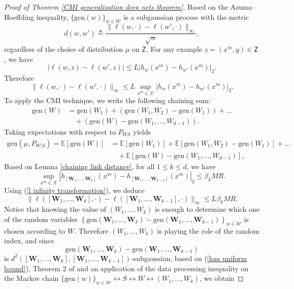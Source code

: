 \documentclass{article}
\newcommand{\E}{\mathbb{E}}
\newcommand{\gen}{\mathrm{gen}}
\newcommand{\W}[0]{\mathcal{W}}
\begin{document}
\begin{proof}[Proof of Theorem \ref{CMI generalization deep nets theorem}]

	Based on the Azuma--Hoeffding inequality, $\{\gen(w)\}_{w\in \mathcal{W}}$ is a subgaussian process with the metric
	\begin{equation}
	d(w, w')\triangleq \frac{\|\ell({w},\cdot)-\ell({w'},\cdot)\|_{\infty}}{\sqrt{n}},\nonumber
	\end{equation}
	regardless of the choice of distribution $\mu$ on $\mathsf{Z}$. For any example $z=(x^m,y)\in \mathsf{Z}$, we have 
\begin{equation}
	|\ell(w,z)-\ell(w',z)|\leq L\left|h_{w}(x^m)-h_{w'}(x^m)\right|_2.\nonumber
\end{equation}
	Therefore 
	\begin{equation}
		\|\ell(w,\cdot)-\ell(w',\cdot)\|_{\infty}\leq L \sup_{x^m\in\mathcal{X}} |h_{w}(x^m)-h_{w'}(x^m)|_{2}.\label{l infinity transformation}
	\end{equation}
	To apply the CMI technique, 
	we write the following chaining sum:
	\begin{align}
		\gen(W)&=\gen(W_1)+(\gen(W_1,W_2)-\gen(W_1))+\dots \nonumber\\
		&\quad +(\gen(W)-\gen(W_1,\dots,W_{d-1})).\nonumber
	\end{align}
	Taking expectations with respect to $P_{WS}$ yields 
	\begin{align}
		\gen(\mu, P_{W|S})= \E[\gen(W)]&=\E[\gen(W_1)]+\E[\gen(W_1,W_2)-\gen(W_1)]+\dots \nonumber\\
		&\quad +\E[\gen(W)-\gen(W_1,\dots,W_{d-1})],\label{expected value chaining sum appendix}
	\end{align}
	Based on Lemma \ref{chaining link distance},  for all $1\leq k \leq d$, we have
	\begin{equation}\label{hypotheses infinity bound}
		\sup_{x^m\in\mathcal{X}} |h_{[\mathbf{W}_1,\dots,\mathbf{W}_k]}(x^m)-h_{[\mathbf{W}_1,\dots,\mathbf{W}_{k-1}]}(x^m)|_{2}\leq \beta_k MR.	
	\end{equation}
	Using (\ref{l infinity transformation}), we deduce
	\begin{equation}\label{loss uniform bound}
		\|\ell([\mathbf{W}_1,\dots,\mathbf{W}_k],\cdot)-\ell([\mathbf{W}_1,\dots,\mathbf{W}_{k-1}],\cdot)\|_{\infty}\leq L\beta_k MR.
	\end{equation}
	Notice that knowing the value of $(W_1,\dots,W_k)$ is enough to determine which one of the random variables $\left\{\gen(\mathbf{W}_1,\dots,\mathbf{W}_k)-\gen(\mathbf{W}_1,\dots,\mathbf{W}_{k-1})\right\}_{w\in \W}$ is chosen according to $W$. Therefore $(W_1,\dots,W_k)$ is playing the role of the random index, and since $$\gen(\mathbf{W}_1,\dots,\mathbf{W}_k)-\gen(\mathbf{W}_1,\dots,\mathbf{W}_{k-1})$$ is $d^2\left([\mathbf{W}_1,\dots,\mathbf{W}_k],[\mathbf{W}_1,\dots,\mathbf{W}_{k-1}]\right)$-subgaussian, based on (\ref{loss uniform bound}), Theorem 2 of \cite{xu2017information} and an application of the data processing inequality on the Markov chain $\{\gen(w)\}_{w\in\W}\leftrightarrow S \leftrightarrow W \leftrightarrow (W_1,\dots,W_k)$, we obtain

\end{proof}
\end{document}
